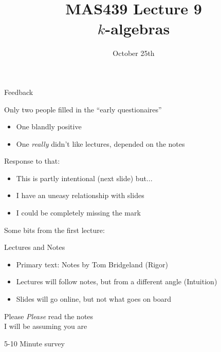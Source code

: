 \documentclass{beamer}
\title{MAS439 Lecture 9 \\ $k$-algebras}
\date{October 25th}
\begin{document}
\begin{frame}
\titlepage
\end{frame}

\begin{frame}{Feedback}

  \begin{block}{Only two people filled in the ``early questionaires''}
    \begin{itemize}
    \item One blandly positive
    \item One \emph{really} didn't like lectures, depended on the notes
\end{itemize}
    \end{block}

    \begin{block}{Response to that:}
      \begin{itemize}
      \item This is partly intentional (next slide) but...
      \item I have an uneasy relationship with slides
      \item I could be completely missing the mark
      \end{itemize}
    \end{block}

\end{frame}

\begin{frame}{Some bits from the first lecture:}
\begin{block}{Lectures and Notes}
  \begin{itemize}
\item  Primary text: Notes by Tom Bridgeland (Rigor)
\item  Lectures will follow notes, but from a different angle (Intuition)
\item  Slides will go online, but not what goes on board
\end{itemize}
\end{block}

\begin{center}

\Huge

Please \emph{Please} read the notes \\
I will be assuming you are
\end{center}

\end{frame}
  
\begin{frame}[plain,c]

\begin{center}

\Huge

5-10 Minute survey 

\end{center}

\end{frame}
\end{document}

